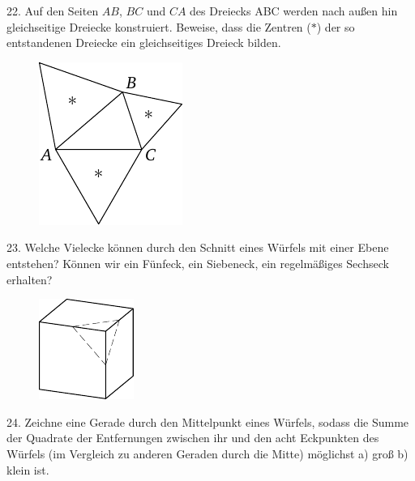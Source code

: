 \begin{problem}{22.}
	Auf den Seiten $AB$, $BC$ und $CA$ des Dreiecks ABC werden nach außen hin gleichseitige Dreiecke konstruiert. Beweise, dass die Zentren ($*$) der so entstandenen Dreiecke ein gleichseitiges Dreieck bilden.
	\begin{figure}
		\includegraphics{taskbook-6}
	\end{figure}
\end{problem}

\begin{problem}{23.}
	Welche Vielecke können durch den Schnitt eines Würfels mit einer Ebene entstehen? Können wir ein Fünfeck, ein Siebeneck, ein regelmäßiges Sechseck erhalten? 
	\begin{figure}
		\includegraphics{taskbook-7}
	\end{figure}
\end{problem}

\begin{problem}{24.}
	Zeichne eine Gerade durch den Mittelpunkt eines Würfels, sodass die Summe der Quadrate der Entfernungen zwischen ihr und den acht Eckpunkten des Würfels (im Vergleich zu anderen Geraden durch die Mitte) möglichst a) groß b) klein ist.
\end{problem}

